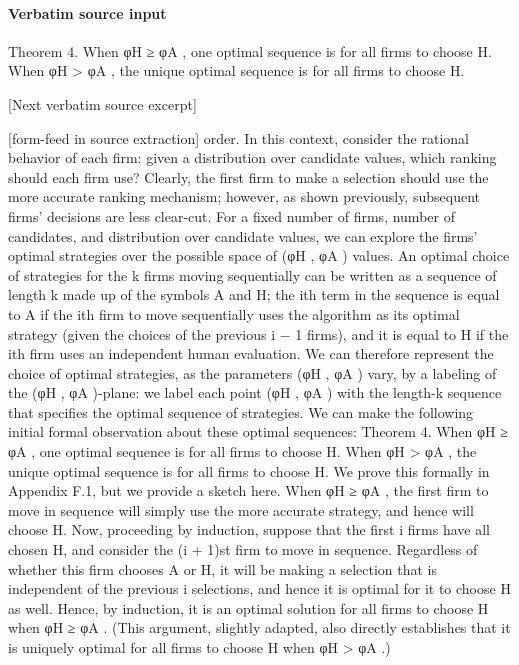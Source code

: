 \documentclass[10pt]{article}
\begin{document}
\paragraph{Verbatim source input}
\begin{ReviewVerbatim}
Theorem 4. When φH ≥ φA , one optimal sequence is for all firms to choose H. When φH > φA , the
unique optimal sequence is for all firms to choose H.

[Next verbatim source excerpt]


[form-feed in source extraction]
order. In this context, consider the rational behavior of each firm: given a distribution over candidate values,
which ranking should each firm use? Clearly, the first firm to make a selection should use the more accurate
ranking mechanism; however, as shown previously, subsequent firms’ decisions are less clear-cut. For a fixed
number of firms, number of candidates, and distribution over candidate values, we can explore the firms’
optimal strategies over the possible space of (φH , φA ) values.
An optimal choice of strategies for the k firms moving sequentially can be written as a sequence of length
k made up of the symbols A and H; the ith term in the sequence is equal to A if the ith firm to move
sequentially uses the algorithm as its optimal strategy (given the choices of the previous i − 1 firms), and it
is equal to H if the ith firm uses an independent human evaluation. We can therefore represent the choice
of optimal strategies, as the parameters (φH , φA ) vary, by a labeling of the (φH , φA )-plane: we label each
point (φH , φA ) with the length-k sequence that specifies the optimal sequence of strategies.
We can make the following initial formal observation about these optimal sequences:
Theorem 4. When φH ≥ φA , one optimal sequence is for all firms to choose H. When φH > φA , the
unique optimal sequence is for all firms to choose H.
We prove this formally in Appendix F.1, but we provide a sketch here. When φH ≥ φA , the first firm
to move in sequence will simply use the more accurate strategy, and hence will choose H. Now, proceeding
by induction, suppose that the first i firms have all chosen H, and consider the (i + 1)st firm to move in
sequence. Regardless of whether this firm chooses A or H, it will be making a selection that is independent
of the previous i selections, and hence it is optimal for it to choose H as well. Hence, by induction, it is an
optimal solution for all firms to choose H when φH ≥ φA . (This argument, slightly adapted, also directly
establishes that it is uniquely optimal for all firms to choose H when φH > φA .)


\end{ReviewVerbatim}
\end{document}
